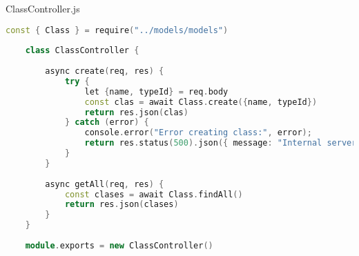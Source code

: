 ClassController.js
\begin{lstlisting}[language=C++]
	const { Class } = require("../models/models")
	
	class ClassController {
		
		async create(req, res) {
			try {
				let {name, typeId} = req.body
				const clas = await Class.create({name, typeId})
				return res.json(clas)
			} catch (error) {
				console.error("Error creating class:", error);
				return res.status(500).json({ message: "Internal server error" });
			}
		}
		
		async getAll(req, res) {
			const clases = await Class.findAll()
			return res.json(clases)
		}
	}
	
	module.exports = new ClassController()
\end{lstlisting}

